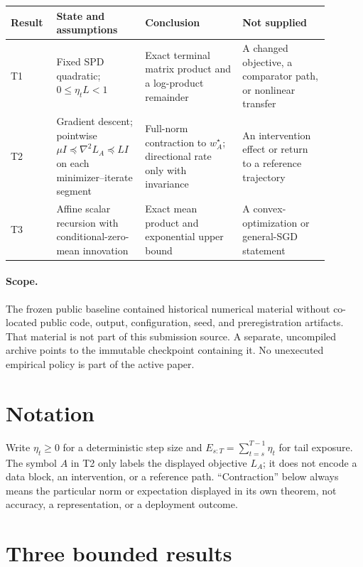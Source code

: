 \documentclass{article}
\begin{document}
\begin{center}
\small
\begin{tabular}{p{0.12\linewidth}|p{0.23\linewidth}|p{0.29\linewidth}|p{0.25\linewidth}}
\textbf{Result} & \textbf{State and assumptions} & \textbf{Conclusion} & \textbf{Not supplied} \\
\hline
T1 & Fixed SPD quadratic; $0\leq\eta_tL<1$ & Exact terminal matrix product and a log-product remainder & A changed objective, a comparator path, or nonlinear transfer \\
T2 & Gradient descent; pointwise $\mu I\preceq\nabla^2L_A\preceq LI$ on each minimizer--iterate segment & Full-norm contraction to $w_A^\star$; directional rate only with invariance & An intervention effect or return to a reference trajectory \\
T3 & Affine scalar recursion with conditional-zero-mean innovation & Exact mean product and exponential upper bound & A convex-optimization or general-SGD statement
\end{tabular}
\end{center}

\paragraph{Scope.}
The frozen public baseline contained historical numerical material without
co-located public code, output, configuration, seed, and preregistration
artifacts. That material is not part of this submission source. A separate,
uncompiled archive points to the immutable checkpoint containing it. No
unexecuted empirical policy is part of the active paper.

\section{Notation}
\label{sec:setup}

Write $\eta_t\geq0$ for a deterministic step size and
$E_{s:T}=\sum_{t=s}^{T-1}\eta_t$ for tail exposure. The symbol $A$ in T2
only labels the displayed objective $L_A$; it does not encode a data block,
an intervention, or a reference path. ``Contraction'' below always means the
particular norm or expectation displayed in its own theorem, not accuracy, a
representation, or a deployment outcome.

\section{Three bounded results}
\label{sec:theory}
\end{document}
